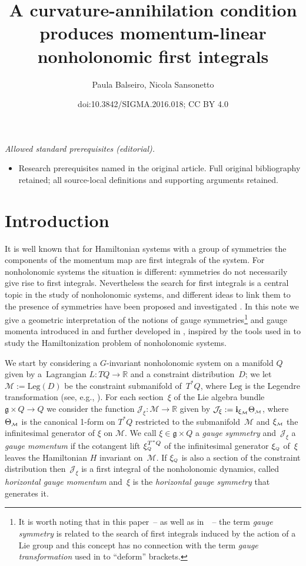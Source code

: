\documentclass[10pt,a4paper]{amsart}
\title{A curvature-annihilation condition produces momentum-linear nonholonomic first integrals}
\author{Paula Balseiro, Nicola Sansonetto}
\date{doi:10.3842/SIGMA.2016.018; CC BY 4.0}
\numberwithin{equation}{section}
\def\M{\mathcal{M}}
\def\J{\mathcal{J}}
\def\R{\mathbb{R}}
\def\L{\mbox{Leg}}
\def\g{\mathfrak{g}}
\def\subM{{\mbox{\tiny{$\M$}}}}
\def\subQQ{{\mbox{\tiny{$Q$}}}}
\begin{document}
\maketitle
\noindent\textit{Allowed standard prerequisites (editorial).}\begin{itemize}
\item Research prerequisites named in the original article. Full original bibliography retained; all source-local definitions and supporting arguments retained.
\end{itemize}\medskip
\section{Introduction} \label{S:Intro}
It is well known that for  Hamiltonian systems with a group of symmetries the
components of the momentum map are f\/irst integrals of the system.
For nonholonomic systems the situation is dif\/ferent:
symmetries do not necessarily give rise to f\/irst integrals. Nevertheless the search for f\/irst
integrals is a central topic in the study of nonholonomic systems, and dif\/ferent ideas
to link them to the presence of symmetries have been proposed
and investigated
\cite{BGMConservation, BKMM,BoMa2001,BoMa2008, spagnoli,Crampin-Mestdag,FSG2008, FSG2009,FSG2012,FRS2007, FS2015,Giachetta,Jotz-Ratiu,Marle95, sniatycki, Zenkov}.
In this note we give a geometric interpretation of the notions
of gauge symmetries\footnote{It is worth noting that in this paper~-- as well as in~\cite{FSG2008,FSG2009,FSG2012}~--  the term {\it gauge symmetry} is related to the
search of f\/irst integrals induced by the action of a Lie group and this concept has no
connection with the term {\it gauge transformation} used in \cite{Paula} to ``deform''
brackets.} and gauge momenta introduced in \cite{BGMConservation} and further
developed in \cite{BoMaKi2002, Cortes, FSG2008, FSG2009, FSG2012}, inspired by the tools used in
\cite{Paula} to study the
Hamiltonization problem of nonholonomic systems.

We start by considering a $G$-invariant nonholonomic system on a manifold $Q$
given by a~Lag\-rangian $L\colon TQ\to \R$ and a constraint distribution~$D$; we let
$\M:= \L(D)$ be the constraint submanifold of~$T^*Q$, where $\L$ is the Legendre
transformation (see, e.g., \cite{Benenti, BlochBook, CushmanBook, Marle95, NF, Pars}).
For each section~$\xi$ of the Lie algebra bundle $\g\times Q \to Q$ we consider the
function $\J_\xi\colon \M \to \R$ given by $\J_\xi := {\bf i}_{\xi_\subM} \Theta_\subM$,
where $\Theta_\subM$ is the canonical 1-form on $T^*Q$ restricted to the
submani\-fold~$\M$ and $\xi_\subM$ the inf\/initesimal generator of $\xi$ on $\M$.
We call $\xi\in \g\times Q$ a {\it gauge symmetry} and~$\J_\xi$ a {\it gauge
momentum} if the cotangent lift $\xi_\subQQ^{T^*Q}$ of the inf\/initesimal generator
$\xi_\subQQ$ of~$\xi$ leaves the Hamiltonian $H$ invariant on~$\M$. If $\xi_\subQQ$ is
also a section of the constraint distribution then~$\J_\xi$ is a f\/irst integral of
the nonholonomic dynamics, called {\it horizontal gauge momentum} and~$\xi$ is the {\it horizontal gauge symmetry} that generates it.
\end{document}
